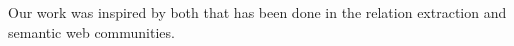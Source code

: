 Our work was inspired by both that has been done in the relation extraction and semantic web communities.

